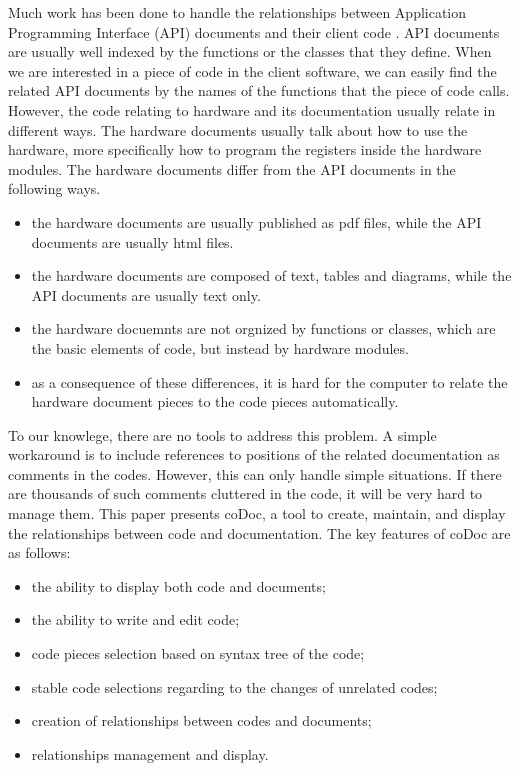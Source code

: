 \documentclass[11pt,letterpaper,oneside]{article}
\begin{document}
Much work has been done to handle the relationships between Application Programming Interface (API) documents and their client code \cite{Pandita_inferring_2012} \cite{wei_inferring_2011}.
API documents are usually well indexed by the functions or the classes that they define.
When we are interested in a piece of code in the client software,
we can easily find the related API documents by the names of the functions that the piece of code calls.
However, the code relating to hardware and its documentation usually relate in different ways. %
The hardware documents usually talk about how to use the hardware,
more specifically how to program the registers inside the hardware modules.
The hardware documents differ from the API documents in the following ways.
\begin{itemize}
\item the hardware documents are usually published as pdf files, while the API documents are usually html files. %
\item the hardware documents are composed of text, tables and diagrams, while the API documents are usually text only.
\item the hardware docuemnts are not orgnized by functions or classes, which are the basic elements of code, but instead by hardware modules.
\item as a consequence of these differences, it is hard for the computer to relate the hardware document pieces to the code pieces automatically.
\end{itemize}

To our knowlege, there are no tools to address this problem.
A simple workaround is to include references to positions of the related documentation as comments in the codes.
However, this can only handle simple situations.
If there are thousands of such comments cluttered in the code,
it will be very hard to manage them.
This paper presents coDoc, a tool to create, maintain, and display the relationships between code and documentation.
The key features of coDoc are as follows:
\begin{itemize}
\item the ability to display both code and documents;
\item the ability to write and edit code;
\item code pieces selection based on syntax tree of the code;
\item stable code selections regarding to the changes of unrelated codes;
\item creation of relationships between codes and documents;
\item relationships management and display.
\end{itemize}
\end{document}
